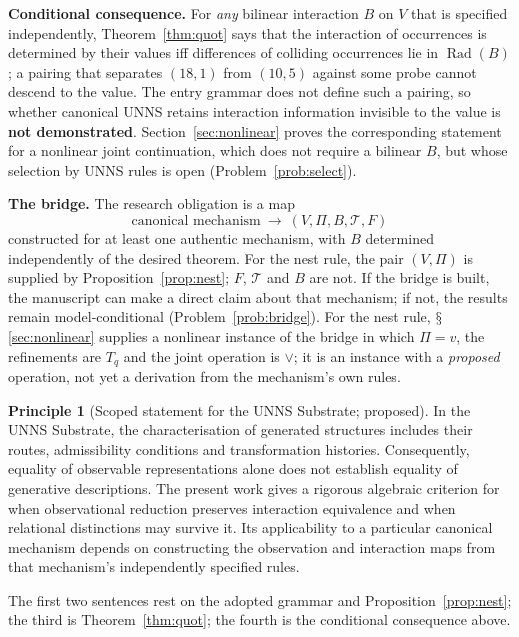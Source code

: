 \documentclass[11pt,a4paper]{article}
\renewcommand{\S}{\ensuremath{\mathsection}}
\newcommand{\Rad}{\operatorname{Rad}}
\newcommand{\vj}{\mathbin{\vee}}
\theoremstyle{plain}
\theoremstyle{definition}
\newtheorem{principle}[theorem]{Principle}
\begin{document}
\par\smallskip\noindent\textbf{Conditional consequence.} For \emph{any} bilinear interaction $B$ on $V$ that is specified independently, Theorem~\ref{thm:quot} says that the interaction of occurrences is determined by their values iff differences of colliding occurrences lie in $\Rad(B)$; a pairing that separates $(18,1)$ from $(10,5)$ against some probe cannot descend to the value. The entry grammar does not define such a pairing, so whether canonical UNNS retains interaction information invisible to the value is \textbf{not demonstrated}. Section~\ref{sec:nonlinear} proves the corresponding statement for a nonlinear joint continuation, which does not require a bilinear $B$, but whose selection by UNNS rules is open (Problem~\ref{prob:select}).
\par\smallskip\noindent\textbf{The bridge.} The research obligation is a map
\[\boxed{\text{canonical mechanism}\ \longrightarrow\ (V,\Pi,B,\mathcal T,F)}\]
constructed for at least one authentic mechanism, with $B$ determined independently of the desired theorem. For the nest rule, the pair $(V,\Pi)$ is supplied by Proposition~\ref{prop:nest}; $F$, $\mathcal T$ and $B$ are not. If the bridge is built, the manuscript can make a direct claim about that mechanism; if not, the results remain model-conditional (Problem~\ref{prob:bridge}). For the nest rule, \S\ref{sec:nonlinear} supplies a nonlinear instance of the bridge in which $\Pi=v$, the refinements are $T_q$ and the joint operation is $\vj$; it is an instance with a \emph{proposed} operation, not yet a derivation from the mechanism's own rules.
\begin{principle}[Scoped statement for the UNNS Substrate; proposed]\label{princ:scoped}
In the UNNS Substrate, the characterisation of generated structures includes their routes, admissibility conditions and transformation histories. Consequently, equality of observable representations alone does not establish equality of generative descriptions. The present work gives a rigorous algebraic criterion for when observational reduction preserves interaction equivalence and when relational distinctions may survive it. Its applicability to a particular canonical mechanism depends on constructing the observation and interaction maps from that mechanism's independently specified rules.
\end{principle}
The first two sentences rest on the adopted grammar and Proposition~\ref{prop:nest}; the third is Theorem~\ref{thm:quot}; the fourth is the conditional consequence above.
\end{document}
